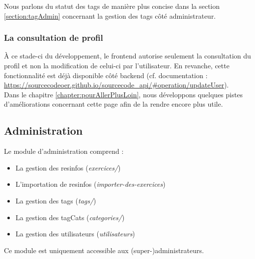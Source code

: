 Nous parlons du statut des \glspl{tag} de manière plus concise dans la section \ref{section:tagAdmin} concernant la gestion des \glspl{tag} côté administrateur.

\subsubsection{La consultation de profil}

À ce stade-ci du développement, le \gls{frontend} autorise seulement la consultation du profil et non la modification de celui-ci par l'utilisateur. En revanche, cette fonctionnalité est déjà disponible côté backend (cf. documentation : \url{https://sourcecodeoer.github.io/sourcecode_api/#operation/updateUser}).\\

Dans le chapitre \ref{chapter:pourAllerPlusLoin}, nous développons quelques pistes d'améliorations concernant cette page afin de la rendre encore plus utile.

\subsection{Administration}

Le module d'administration comprend :

\begin{itemize}
    \item La gestion des \glspl{resinfo} (\textit{exercices/})
    \item L'importation de \glspl{resinfo} (\textit{importer-des-exercices})
    \item La gestion des \glspl{tag} (\textit{tags/})
    \item La gestion des \glspl{tagCat} (\textit{categories/})
    \item La gestion des utilisateurs (\textit{utilisateurs})
\end{itemize}

Ce module est uniquement accessible aux (super-)administrateurs.

